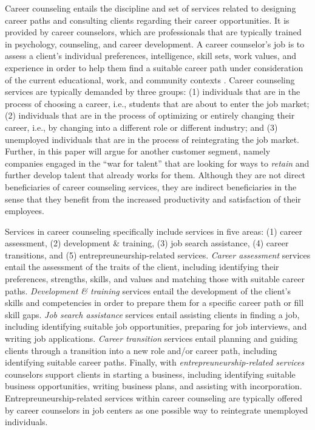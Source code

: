 Career counseling entails the discipline and set of services related to designing career paths and consulting
clients regarding their career opportunities. It is provided by career counselors, which are professionals that
are typically trained in psychology, counseling, and career development. A career counselor's job is to assess 
a client's individual preferences, intelligence, skill sets, work values, and experience in order to help them
find a suitable career path under consideration of the current educational, work, and community contexts
\citep{americanpsychologicalassociationCareerCounseling}. Career counseling services are typically demanded by
three groups: (1) individuals that are in the process of choosing a career, i.e., students that are about to enter
the job market; (2) individuals that are in the process of optimizing or entirely changing their career, i.e.,
by changing into a different role or different industry; and (3) unemployed individuals that are in the process
of reintegrating the job market. Further, in this paper will argue for another customer segment, namely companies
engaged in the ``war for talent'' that are looking for ways to \textit{retain} and further develop talent that
already works for them. Although they are not direct beneficiaries of career counseling services, they are
indirect beneficiaries in the sense that they benefit from the increased productivity and satisfaction of their
employees.

Services in career counseling specifically include services in five areas: (1) career assessment, (2) development
\& training, (3) job search assistance, (4) career transitions, and (5) entrepreuneurship-related services.
\textit{Career assessment} services entail the assessment of the traits of the client, including identifying their
preferences, strengths, skills, and values and matching those with suitable career paths. \textit{Development
\& training} services entail the development of the client's skills and competencies in order to prepare them
for a specific career path or fill skill gaps. \textit{Job search assistance} services entail assisting clients
in finding a job, including identifying suitable job opportunities, preparing for job interviews, and writing
job applications. \textit{Career transition} services entail planning and guiding clients through a transition
into a new role and/or career path, including identifying suitable career paths. Finally, with
\textit{entrepreuneurship-related services} counselors support clients in starting a business, including identifying
suitable business opportunities, writing business plans, and assisting with incorporation. Entrepreuneurship-related
services within career counseling are typically offered by career counselors in job centers as one possible way to
reintegrate unemployed individuals.


